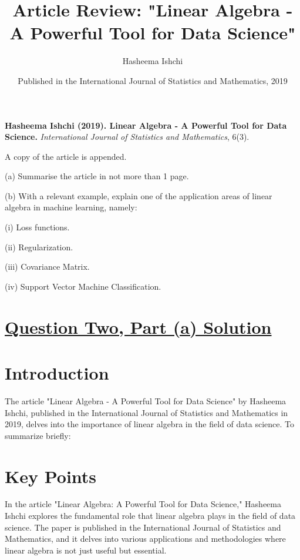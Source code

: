 \documentclass{article}
\begin{document}
\textbf{Hasheema Ishchi (2019). Linear Algebra - A Powerful Tool for Data Science.}
\emph{International Journal of Statistics and Mathematics}, 6(3).

A copy of the article is appended.

(a) Summarise the article in not more than 1 page.

(b) With a relevant example, explain one of the application areas of linear algebra in machine learning, namely:

    (i) Loss functions.
    
    (ii) Regularization.
    
    (iii) Covariance Matrix.
    
    (iv) Support Vector Machine Classification.

\section*{\uline{\large Question Two, Part (a) Solution}}

\title{Article Review: "Linear Algebra - A Powerful Tool for Data Science"}
\author{Hasheema Ishchi}
\date{Published in the International Journal of Statistics and Mathematics, 2019}

\maketitle

\section{Introduction}

The article "Linear Algebra - A Powerful Tool for Data Science" by Hasheema Ishchi, published in the International Journal of Statistics and Mathematics in 2019, delves into the importance of linear algebra in the field of data science. To summarize briefly:

\section{Key Points}

In the article "Linear Algebra: A Powerful Tool for Data Science," Hasheema Ishchi explores the fundamental role that linear algebra plays in the field of data science. The paper is published in the International Journal of Statistics and Mathematics, and it delves into various applications and methodologies where linear algebra is not just useful but essential.
\end{document}
